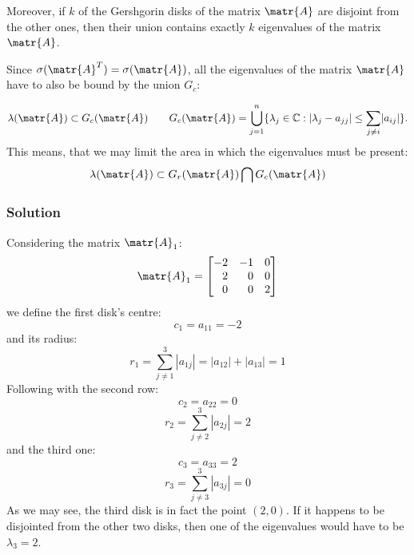 Moreover, if $k$ of the Gershgorin disks of the matrix $\matr{A}$ are disjoint from the other ones, then their union contains exactly $k$ eigenvalues of the matrix $\matr{A}$.

Since $\sigma(\matr{A}^T)=\sigma(\matr{A})$, all the eigenvalues of the matrix $\matr{A}$ have to also be bound by the union $G_c$:

\begin{equation*}
  \lambda(\matr{A})\subset G_c(\matr{A})\qquad
  G_c(\matr{A})=\bigcup_{j=1}^n\{\lambda_j\in\mathbb{C}:\lvert \lambda_j - a_{jj}\rvert\le \sum_{j \neq i} \lvert a_{ij}\rvert\}.
\end{equation*}
This means, that we may limit the area in which the eigenvalues must be present:
\begin{equation*}
  \lambda(\matr{A})\subset G_r(\matr{A})\bigcap G_c(\matr{A})
\end{equation*}

\subsubsection*{Solution}

Considering the matrix $\matr{A}_1$:
\begin{equation*}
  \matr{A}_1 = 
  \begin{bmatrix}
              -2 &           -1 & 0\\
    \phantom{-}2 & \phantom{-}0 & 0\\
    \phantom{-}0 & \phantom{-}0 & 2
  \end{bmatrix}
\end{equation*}
we define the first disk's centre:
\begin{equation*}
     c_1 = a_{11} = -2
\end{equation*}
and its radius:
\begin{equation*}
    r_1 = \sum_{j \neq 1}^3 |a_{1j}| = |a_{12}| + |a_{13}| = 1 
\end{equation*}
Following with the second row:
\begin{equation*}
    c_2 = a_{22} = 0
\end{equation*}
\begin{equation*}
    r_2 = \sum_{j \neq 2}^3 |a_{2j}| = 2
\end{equation*}
and the third one:
\begin{equation*}
    c_3 = a_{33} = 2
\end{equation*}
\begin{equation*}
    r_3 = \sum_{j \neq 3}^3 |a_{3j}| = 0
\end{equation*}
As we may see, the third disk is in fact the point $(2,0)$. If it happens to be disjointed from the other two disks, then one of the eigenvalues would have to be $\lambda_3=2$.

